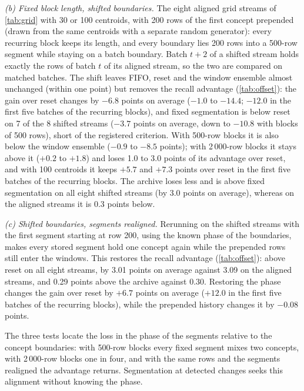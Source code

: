 \documentclass[11pt]{article}
\theoremstyle{plain}
\theoremstyle{definition}
\theoremstyle{remark}
\begin{document}
\emph{(b) Fixed block length, shifted boundaries.} The eight aligned grid streams of \cref{tab:grid} with 30 or 100
centroids, with 200 rows of the first concept prepended (drawn from the same centroids with a separate random
generator): every recurring block keeps its length, and every boundary lies 200 rows into a 500-row segment while
staying on a batch boundary. Batch $t+2$ of a shifted stream holds exactly the rows of batch $t$ of its aligned
stream, so the two are compared on matched batches. The shift leaves FIFO, reset and the window ensemble almost
unchanged (within one point) but removes the recall advantage (\cref{tab:offset}): the gain over reset changes by
$-6.8$ points on average ($-1.0$ to $-14.4$; $-12.0$ in the first five batches of the recurring blocks), and fixed
segmentation is below reset on 7 of the 8 shifted streams ($-3.7$ points on average, down to $-10.8$ with blocks of
500 rows), short of the registered criterion. With 500-row blocks it is also below the window ensemble ($-0.9$ to
$-8.5$ points); with 2\,000-row blocks it stays above it ($+0.2$ to $+1.8$) and loses 1.0 to 3.0 points of its
advantage over reset, and with 100 centroids it keeps $+5.7$ and $+7.3$ points over reset in the first five batches of
the recurring blocks. The archive loses less and is above fixed
segmentation on all eight shifted streams (by 3.0 points on average), whereas on the aligned streams it is 0.3
points below.

\emph{(c) Shifted boundaries, segments realigned.} Rerunning on the shifted streams with the first segment starting
at row 200, using the known phase of the boundaries, makes every stored segment hold one concept again while the
prepended rows still enter the windows. This restores the recall advantage (\cref{tab:offset}): above reset on all
eight streams, by 3.01 points on average against 3.09 on the aligned streams, and 0.29 points above the archive
against 0.30. Restoring the phase changes the gain over reset by $+6.7$ points on average ($+12.0$ in the first five
batches of the recurring blocks), while the prepended history changes it by $-0.08$ points.

The three tests locate the loss in the phase of the segments relative to the concept boundaries: with 500-row
blocks every fixed segment mixes two concepts, with 2\,000-row blocks one in four, and with the same rows and the
segments realigned the advantage returns. Segmentation at detected changes seeks this alignment without knowing the
phase.
\end{document}
